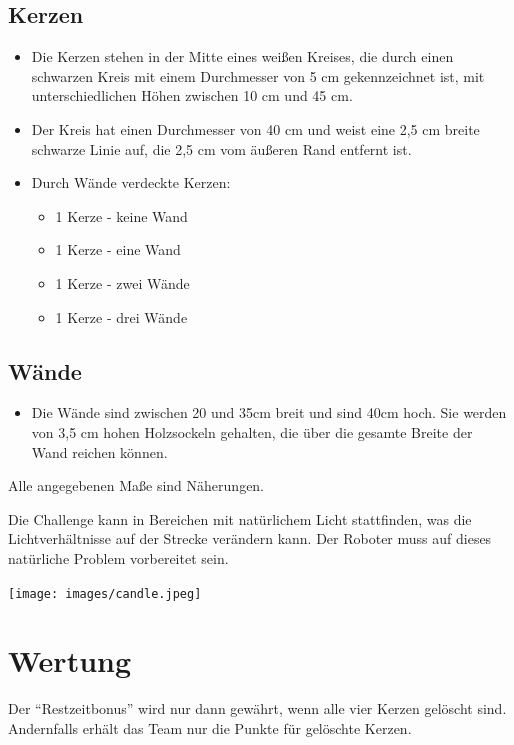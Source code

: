 \documentclass[a4paper,12pt]{article}
\begin{document}
\subsection{Kerzen}
\begin{itemize}
	\item Die Kerzen stehen in der Mitte eines weißen Kreises, die durch
		einen schwarzen Kreis mit einem Durchmesser von 5 cm
		gekennzeichnet ist, mit unterschiedlichen Höhen zwischen 10 cm
		und 45 cm.
	\item  Der Kreis hat einen Durchmesser von 40 cm und weist eine 2,5 cm
		breite schwarze Linie auf, die 2,5 cm vom äußeren Rand entfernt
		ist.
	\item Durch Wände verdeckte Kerzen:
	\begin{itemize}
		\item 1 Kerze - keine Wand
		\item 1 Kerze - eine Wand
		\item 1 Kerze - zwei Wände
		\item 1 Kerze - drei Wände
	\end{itemize}
\end{itemize}

\subsection{Wände}
\begin{itemize}
	\item Die Wände sind zwischen 20 und 35cm breit und sind 40cm hoch. Sie
		werden von 3,5 cm hohen Holzsockeln gehalten, die über die
		gesamte Breite der Wand reichen können.
\end{itemize}
\begin{center}
	Alle angegebenen Maße sind Näherungen.
\end{center}
Die Challenge kann in Bereichen mit natürlichem Licht stattfinden, was die
Lichtverhältnisse auf der Strecke verändern kann. Der Roboter muss auf dieses
natürliche Problem vorbereitet sein.
\begin{center}
\texttt{[image: images/candle.jpeg]}
\end{center}

\section{Wertung}
Der "`Restzeitbonus"' wird nur dann gewährt, wenn alle vier Kerzen gelöscht
sind.  Andernfalls erhält das Team nur die Punkte für gelöschte Kerzen.
\end{document}

